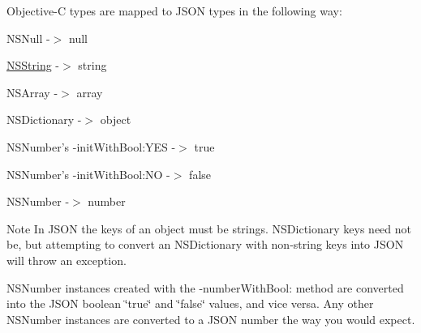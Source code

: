 \-Objective-\/\-C types are mapped to \-J\-S\-O\-N types in the following way\-:

\begin{DoxyItemize}
\item \-N\-S\-Null -\/$>$ null \item \hyperlink{class_n_s_string}{\-N\-S\-String} -\/$>$ string \item \-N\-S\-Array -\/$>$ array \item \-N\-S\-Dictionary -\/$>$ object \item \-N\-S\-Number's -\/init\-With\-Bool\-:\-Y\-E\-S -\/$>$ true \item \-N\-S\-Number's -\/init\-With\-Bool\-:\-N\-O -\/$>$ false \item \-N\-S\-Number -\/$>$ number\end{DoxyItemize}
\begin{DoxyNote}{\-Note}
\-In \-J\-S\-O\-N the keys of an object must be strings. \-N\-S\-Dictionary keys need not be, but attempting to convert an \-N\-S\-Dictionary with non-\/string keys into \-J\-S\-O\-N will throw an exception.
\end{DoxyNote}
\-N\-S\-Number instances created with the -\/number\-With\-Bool\-: method are converted into the \-J\-S\-O\-N boolean \char`\"{}true\char`\"{} and \char`\"{}false\char`\"{} values, and vice versa. \-Any other \-N\-S\-Number instances are converted to a \-J\-S\-O\-N number the way you would expect. 